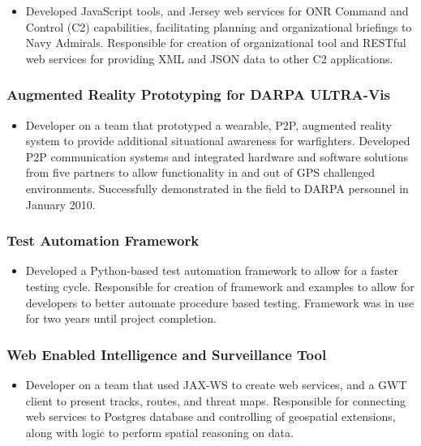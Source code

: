 \documentclass[11pt]{article}
\begin{document}
\begin{itemize}
\item Developed JavaScript tools, and Jersey web services for ONR Command and Control (C2) capabilities, facilitating planning and organizational briefings to Navy Admirals. Responsible for creation of organizational tool and RESTful web services for providing XML and JSON data to other C2 applications.
\end{itemize}
\subsubsection*{Augmented Reality Prototyping for DARPA ULTRA-Vis}
\label{sec-1.1.4}

\begin{itemize}
\item Developer on a team that prototyped a wearable, P2P, augmented reality system to provide additional situational awareness for warfighters. Developed P2P communication systems and integrated hardware and software solutions from five partners to allow functionality in and out of GPS challenged environments. Successfully demonstrated in the field to DARPA personnel in January 2010.
\end{itemize}
\subsubsection*{Test Automation Framework}
\label{sec-1.1.5}

\begin{itemize}
\item Developed a Python-based test automation framework to allow for a faster testing cycle. Responsible for creation of framework and examples to allow for developers to better automate procedure based testing. Framework was in use for two years until project completion.
\end{itemize}
\subsubsection*{Web Enabled Intelligence and Surveillance Tool}
\label{sec-1.1.6}

\begin{itemize}
\item Developer on a team that used JAX-WS to create web services, and a GWT client to present tracks, routes, and threat maps. Responsible for connecting web services to Postgres database and controlling of geospatial extensions, along with logic to perform spatial reasoning on data.
\end{itemize}
\end{document}
